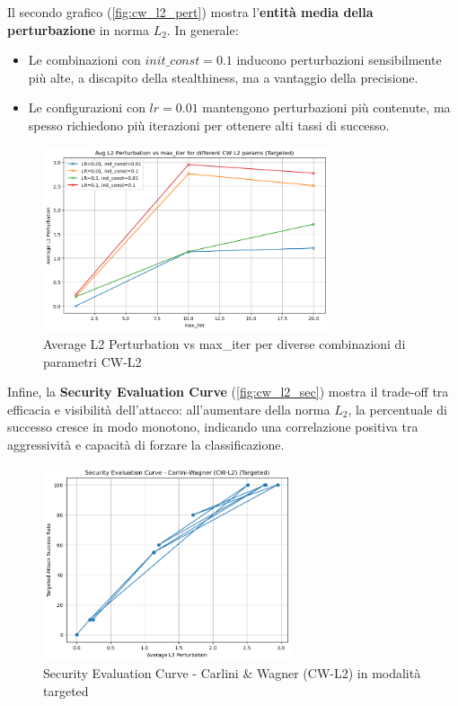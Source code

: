             \noindent Il secondo grafico (\autoref{fig:cw_l2_pert}) mostra l'\textbf{entità media della perturbazione} in norma $L_2$.
            In generale:
                \begin{itemize}
                  \item Le combinazioni con $init\_const=0.1$ inducono perturbazioni sensibilmente più alte, a discapito della stealthiness, ma a vantaggio della precisione.
                  
                  \item Le configurazioni con $lr=0.01$ mantengono perturbazioni più contenute, ma spesso richiedono più iterazioni per ottenere alti tassi di successo.
                \end{itemize}
            
            \begin{figure}[H]
                \centering
                \includegraphics[width=0.75\textwidth]{images/cw_L2_perturbation_vs_maxiter.png}
                \caption{Average L2 Perturbation vs max\_iter per diverse combinazioni di parametri CW-L2}
                \label{fig:cw_l2_pert}
            \end{figure}
            
            \noindent Infine, la \textbf{Security Evaluation Curve} (\autoref{fig:cw_l2_sec}) mostra il trade-off tra efficacia e visibilità dell’attacco: all’aumentare della norma $L_2$, la percentuale di successo cresce in modo monotono, indicando una correlazione positiva tra aggressività e capacità di forzare la classificazione.
            
            \begin{figure}[H]
                \centering
                \includegraphics[width=0.65\textwidth]{images/cw_L2_security_curve.png}
                \caption{Security Evaluation Curve - Carlini \& Wagner (CW-L2) in modalità targeted}
                \label{fig:cw_l2_sec}
            \end{figure}

